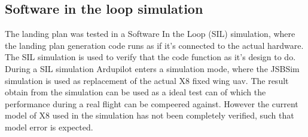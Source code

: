 \subsection{Software in the loop simulation}
The landing plan was tested in a Software In the Loop (SIL) simulation, where the landing plan generation code runs as if it's connected to the actual hardware. The SIL simulation is used to verify that the code function as it's design to do. During a SIL simulation Ardupilot enters a simulation mode, where the JSBSim simulation is used as replacement of the actual X8 fixed wing \gls{uav}. The result obtain from the simulation can be used as a ideal test can of which the performance during a real flight can be compeered against. However the current model of X8 used in the simulation has not been completely verified, such that model error is expected.

